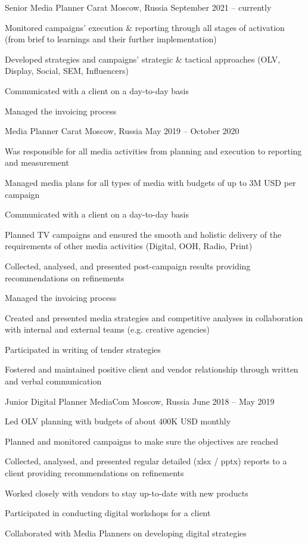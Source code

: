 \documentclass[11pt, a4paper]{awesome-cv}
\begin{document}
\begin{cventries}
\cventry
	{Senior Media Planner}
	{Carat}
	{Moscow, Russia}
	{September 2021 -- currently}
	{
		\begin{cvitems}
			\item {Monitored campaigns' execution \& reporting through all stages of activation (from brief to learnings and their further implementation)}
			\item {Developed strategies and campaigns’ strategic \& tactical approaches (OLV, Display, Social, SEM, Influencers)}
			\item {Communicated with a client on a day-to-day basis}
			\item {Managed the invoicing process}
		\end{cvitems}
	}

\cventry
	{Media Planner}
	{Carat}
	{Moscow, Russia}
	{May 2019 -- October 2020}
	{
		\begin{cvitems}
			\item {Was responsible for all media activities from planning and execution to reporting and measurement}
			\item {Managed media plans for all types of media with budgets of up to 3M USD per campaign}
			\item {Communicated with a client on a day-to-day basis}
			\item {Planned TV campaigns and ensured the smooth and holistic delivery of the requirements of other media activities (Digital, OOH, Radio, Print)}
			\item {Collected, analysed, and presented post-campaign results providing recommendations on refinements}
			\item {Managed the invoicing process}
			\item {Created and presented media strategies and competitive analyses in collaboration with internal and external teams (e.g. creative agencies)}
			\item {Participated in writing of tender strategies}
			\item {Fostered and maintained positive client and vendor relationship through written and verbal communication}
		\end{cvitems}
	}
	
\cventry
	{Junior Digital Planner}
	{MediaCom}
	{Moscow, Russia}
	{June 2018 -- May 2019}
	{
		\begin{cvitems}
			\item {Led OLV planning with budgets of about 400K USD monthly}
			\item {Planned and monitored campaigns to make sure the objectives are reached}
			\item {Collected, analysed, and presented regular detailed (xlsx / pptx) reports to a client providing recommendations on refinements}
			\item {Worked closely with vendors to stay up-to-date with new products}
			\item {Participated in conducting digital workshops for a client}
			\item {Collaborated with Media Planners on developing digital strategies}
		\end{cvitems}
	}


\end{cventries}
\end{document}
